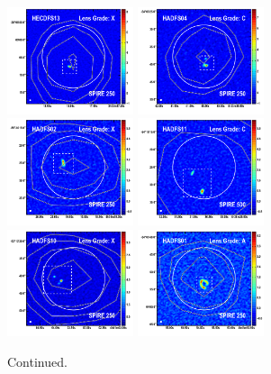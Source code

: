 \documentclass[iop]{emulateapj}
\begin{document}
\begin{figure}[!tbp]
\begin{centering}
\includegraphics[width=0.331\textwidth]{../Figures/overlays/HECDFS13_870_250.pdf}
\includegraphics[width=0.331\textwidth]{../Figures/overlays/HADFS04_870_250.pdf}
\includegraphics[width=0.331\textwidth]{../Figures/overlays/HADFS02_870_250.pdf}
\includegraphics[width=0.331\textwidth]{../Figures/overlays/HADFS11_870_500.pdf}
\includegraphics[width=0.331\textwidth]{../Figures/overlays/HADFS10_870_250.pdf}
\includegraphics[width=0.331\textwidth]{../Figures/overlays/HADFS01_870_250.pdf}
\end{centering}

\caption{ Continued.}
\addtocounter{figure}{-1}

\end{figure}
\end{document}
